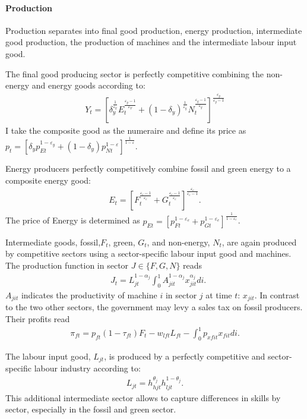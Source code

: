 \paragraph{Production}
Production separates into final good production, energy production, intermediate good production, the production of machines and the intermediate labour input good. 

The final good producing sector is perfectly competitive combining the non-energy and energy goods according to:
\begin{align}
Y_t=\left[\delta_y^\frac{1}{\varepsilon_y}E_{t}^{\frac{\varepsilon_y-1}{\varepsilon_Y}}+(1-\delta_y)^\frac{1}{\varepsilon_y}N_{t}^{\frac{\varepsilon_y-1}{\varepsilon_y}}\right]^\frac{\varepsilon_y}{\varepsilon_y-1}
\end{align} 
I take the composite good as the numeraire and define its price as $p_t=\left[\delta_yp_{Et}^{1-\varepsilon_y}+(1-\delta_y)p_{Nt}^{1-\varepsilon}\right]^{\frac{1}{1-\varepsilon}}$.

Energy producers perfectly competitively combine fossil and green energy to a composite energy good:
\begin{align}
E_t=\left[F_t^\frac{\varepsilon_e-1}{\varepsilon_e}+G_t^\frac{\varepsilon_e-1}{\varepsilon_e}\right]^\frac{\varepsilon_e}{\varepsilon_e-1}.
\end{align}
The price of Energy is determined as  $p_{Et}= \left[p_{Ft}^{1-\varepsilon_e}+p_{Gt}^{1-\varepsilon_e}\right]^\frac{1}{{1-\varepsilon_e}}$.

Intermediate goods, fossil,$F_t$, green, $G_t$, and non-energy, $N_t$, are again produced by competitive sectors using a sector-specific labour input good and machines. The production function in sector $J\in \{F,G,N\}$ reads
\begin{align}
&J_{t}= L_{jt}^{1-\alpha_j}\int_{0}^{1}A_{jit}^{1-\alpha_j}x_{jit}^{\alpha_j} di.
\end{align}
$A_{jit}$ indicates the productivity of machine $i$ in sector $j$ at time $t$: $x_{jit}$. In contrast to the two other sectors, the government may levy a sales tax on fossil producers. Their profits read
\begin{align}
\pi_{ft}=p_{ft}(1-\tau_{ft})F_t-w_{lft}L_{ft}-\int_{0}^{1}p_{xfit}x_{fit}di.
\end{align}

The labour input good, $L_{jt}$, is produced by a perfectly competitive and sector-specific labour industry according to: 
\begin{align}
L_{jt}=h_{hjt}^{\theta_j}h_{ljt}^{1-\theta_j}.
\end{align}
This additional intermediate sector allows to capture differences in skills by sector, especially in the fossil and green sector.

